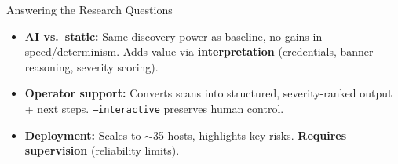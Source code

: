 \begin{frame}{Answering the Research Questions}
    \footnotesize

    \begin{itemize}
        \item[\textbf{RQ1}] \textbf{AI vs.\ static:} Same discovery power as baseline, no gains in speed/determinism.
        Adds value via \textbf{interpretation} (credentials, banner reasoning, severity scoring).

        \vspace{0.2em}
        \item[\textbf{RQ2}] \textbf{Operator support:} Converts scans into structured, severity-ranked output + next steps.
        \texttt{--interactive} preserves human control.

        \vspace{0.2em}
        \item[\textbf{RQ3}] \textbf{Deployment:} Scales to $\sim$35 hosts, highlights key risks.
        \textbf{Requires supervision} (reliability limits).
    \end{itemize}

\end{frame}%
%
%
